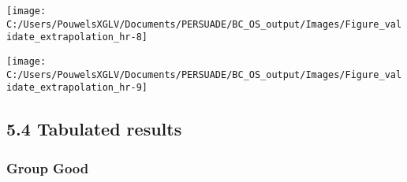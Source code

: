 \documentclass[
]{article}
\begin{document}
\begin{flushleft}\texttt{[image: C:/Users/PouwelsXGLV/Documents/PERSUADE/BC\_OS\_output/Images/Figure\_validate\_extrapolation\_hr-8]} \end{flushleft}

\begin{flushleft}\texttt{[image: C:/Users/PouwelsXGLV/Documents/PERSUADE/BC\_OS\_output/Images/Figure\_validate\_extrapolation\_hr-9]} \end{flushleft}

\clearpage

\subsection{5.4 Tabulated results}\label{tabulated-results}

\subsubsection{Group Good}\label{group-good}
\end{document}
